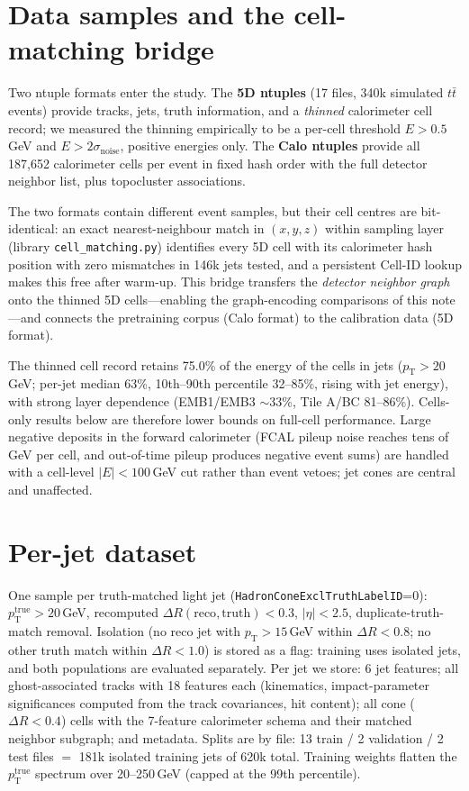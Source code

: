 \documentclass[11pt]{article}
\newcommand{\pt}{\ensuremath{p_\mathrm{T}}}
\newcommand{\pttrue}{\ensuremath{p_\mathrm{T}^\mathrm{true}}}
\begin{document}
\section{Data samples and the cell-matching bridge}
Two ntuple formats enter the study. The \textbf{5D ntuples} (17 files, 340k simulated
$t\bar t$ events) provide tracks, jets, truth information, and a \emph{thinned}
calorimeter cell record; we measured the thinning empirically to be a per-cell
threshold $E>0.5$\,GeV and $E>2\sigma_\text{noise}$, positive energies only. The
\textbf{Calo ntuples} provide all 187{,}652 calorimeter cells per event in fixed hash
order with the full detector neighbor list, plus topocluster associations.

The two formats contain different event samples, but their cell centres are
bit-identical: an exact nearest-neighbour match in $(x,y,z)$ within sampling layer
(library \texttt{cell\_matching.py}) identifies every 5D cell with its calorimeter
hash position with zero mismatches in 146k jets tested, and a persistent Cell-ID
lookup makes this free after warm-up. This bridge transfers the \emph{detector
neighbor graph} onto the thinned 5D cells---enabling the graph-encoding comparisons of
this note---and connects the pretraining corpus (Calo format) to the calibration data
(5D format).

The thinned cell record retains 75.0\% of the energy of the cells in jets
($\pt>20$\,GeV; per-jet median 63\%, 10th--90th percentile 32--85\%, rising with jet
energy), with strong layer dependence (EMB1/EMB3 $\sim$33\%, Tile A/BC 81--86\%).
Cells-only results below are therefore lower bounds on full-cell performance. Large
negative deposits in the forward calorimeter (FCAL pileup noise reaches tens of GeV
per cell, and out-of-time pileup produces negative event sums) are handled with a
cell-level $|E|<100$\,GeV cut rather than event vetoes; jet cones are central and
unaffected.

\section{Per-jet dataset}
One sample per truth-matched light jet (\texttt{HadronConeExclTruthLabelID}=0):
$\pttrue>20$\,GeV, recomputed $\Delta R(\text{reco},\text{truth})<0.3$, $|\eta|<2.5$,
duplicate-truth-match removal. Isolation (no reco jet with $\pt>15$\,GeV within
$\Delta R<0.8$; no other truth match within $\Delta R<1.0$) is stored as a flag:
training uses isolated jets, and both populations are evaluated separately. Per jet we
store: 6 jet features; all ghost-associated tracks with 18 features each (kinematics,
impact-parameter significances computed from the track covariances, hit content); all
cone ($\Delta R<0.4$) cells with the 7-feature calorimeter schema and their matched
neighbor subgraph; and metadata. Splits are by file: 13 train / 2 validation / 2 test
files $=$ 181k isolated training jets of 620k total. Training weights flatten the
\pttrue{} spectrum over 20--250\,GeV (capped at the 99th percentile).
\end{document}
